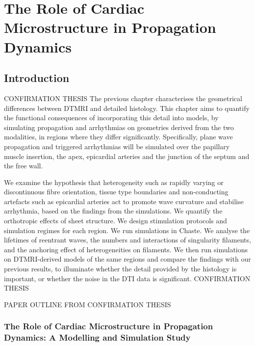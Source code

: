\chapter{The Role of Cardiac Microstructure in Propagation Dynamics}
\dblspace
\begin{quote}{\em }\end{quote}

\section{Introduction}
\label{sec:review:introduction}
CONFIRMATION THESIS
The previous chapter characterises the geometrical differences between DTMRI and detailed histology. This chapter aims to quantify the functional consequences of incorporating this detail into models, by simulating propagation and arrhythmias on geometries derived from the two modalities, in regions where they differ significantly. Specifically, plane wave propagation and triggered arrhythmias will be simulated over the papillary muscle insertion, the apex, epicardial arteries and the junction of the septum and the free wall.

We examine the hypothesis that heterogeneity such as rapidly varying or discontinuous fibre orientation, tissue type boundaries and non-conducting artefacts such as epicardial arteries act to promote wave curvature and stabilise arrhythmia, based on the findings from the simulations. We quantify the orthotropic effects of sheet structure. We design stimulation protocols and simulation regimes for each region. We run simulations in Chaste. We analyse the lifetimes of reentrant waves, the numbers and interactions of singularity filaments, and the anchoring effect of heterogeneities on filaments. We then run simulations on DTMRI-derived models of the same regions and compare the findings with our previous results, to illuminate whether the detail provided by the histology is important, or whether the noise in the DTI data is significant.
CONFIRMATION THESIS

PAPER OUTLINE FROM CONFIRMATION THESIS
\subsection{The Role of Cardiac Microstructure in Propagation Dynamics: A Modelling and Simulation Study}
